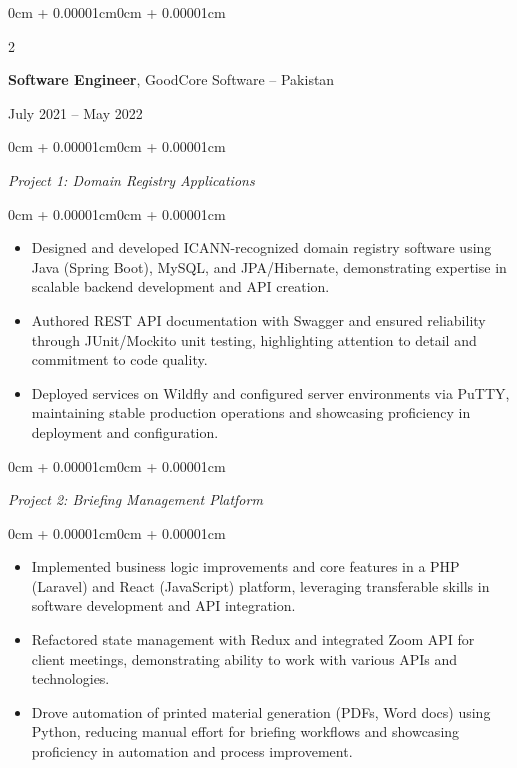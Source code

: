 \documentclass[10pt, letterpaper]{article}
\newenvironment{highlights}{
    \begin{itemize}[
        topsep=0.10cm,
        parsep=0.10cm,
        partopsep=0pt,
        itemsep=0pt,
        leftmargin=0cm + 10pt
    ]
}{
    \end{itemize}
}
\newenvironment{onecolentry}{
    \begin{adjustwidth}{0cm + 0.00001cm}{0cm + 0.00001cm}
}{
    \end{adjustwidth}
}
\newenvironment{twocolentry}[2][]{
    \onecolentry
    \def\secondColumn{#2}
    \setcolumnwidth{\fill, 5cm}
    \begin{paracol}{2}
}{
    \switchcolumn \raggedleft \secondColumn
    \end{paracol}
    \endonecolentry
}
\begin{document}
\begin{twocolentry}{July 2021 – May 2022}
    \textbf{Software Engineer}, GoodCore Software -- Pakistan
\end{twocolentry}
\vspace{0.10cm}
\begin{onecolentry}
\textit{Project 1: Domain Registry Applications}
\end{onecolentry}
\vspace{0.05cm}
\begin{onecolentry}
\begin{highlights}
    \item Designed and developed ICANN-recognized domain registry software using Java (Spring Boot), MySQL, and JPA/Hibernate, demonstrating expertise in scalable backend development and API creation.
    \item Authored REST API documentation with Swagger and ensured reliability through JUnit/Mockito unit testing, highlighting attention to detail and commitment to code quality.
    \item Deployed services on Wildfly and configured server environments via PuTTY, maintaining stable production operations and showcasing proficiency in deployment and configuration.
\end{highlights}
\end{onecolentry}
\begin{onecolentry}
\textit{Project 2: Briefing Management Platform}
\end{onecolentry}
\vspace{0.05cm}
\begin{onecolentry}
\begin{highlights}
    \item Implemented business logic improvements and core features in a PHP (Laravel) and React (JavaScript) platform, leveraging transferable skills in software development and API integration.
    \item Refactored state management with Redux and integrated Zoom API for client meetings, demonstrating ability to work with various APIs and technologies.
    \item Drove automation of printed material generation (PDFs, Word docs) using Python, reducing manual effort for briefing workflows and showcasing proficiency in automation and process improvement.
\end{highlights}
\end{onecolentry}

\end{document}
